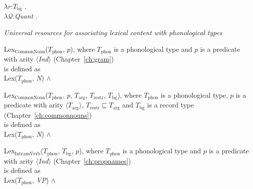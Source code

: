 $\lambda r$:$T_{\mathrm{bg}}$ . \\
\hspace*{1em}$\lambda\mathcal{Q}$:\textit{Quant} . \\
\hspace*{2em}


\textit{Universal resources for associating lexical content with
  phonological types}

Lex$_{\mathrm{CommonNoun}}$($T_{\mathrm{phon}}$, $p$), where
$T_{\mathrm{phon}}$ is a phonological type and $p$ is a predicate with
arity $\langle$\textit{Ind}$\rangle$ (Chapter~\ref{ch:gram})\\
is defined as \\
Lex($T_{\mathrm{phon}}$, \textit{N}) \d{$\wedge$}

Lex$_{\mathrm{CommonNoun}}$($T_{\mathrm{phon}}$, $p$,
  $T_{\mathrm{arg}}$, $T_{\mathrm{restr}}$, $T_{\mathrm{bg}}$),
  where $T_{\mathrm{phon}}$ is a phonological type, $p$ is a predicate
  with arity $\langle T_{\mathrm{arg}}\rangle$,
  $T_{\mathrm{restr}}\sqsubseteq T_{\mathrm{arg}}$ and
  $T_{\mathrm{bg}}$ is a record type (Chapter~\ref{ch:commonnouns}) \\
 is defined as\\
Lex($T_{\mathrm{phon}}$, \textit{N}) \d{$\wedge$} 

Lex$_{\mathrm{IntransVerb}}$($T_{\mathrm{phon}}$, $T_{\mathrm{bg}}$, $p$), where
$T_{\mathrm{phon}}$ is a phonological type and $p$ is a predicate with
arity $\langle$\textit{Ind}$\rangle$ (Chapter~\ref{ch:propnames})\\
is defined as \\
Lex($T_{\mathrm{phon}}$, \textit{VP}) \d{$\wedge$}

